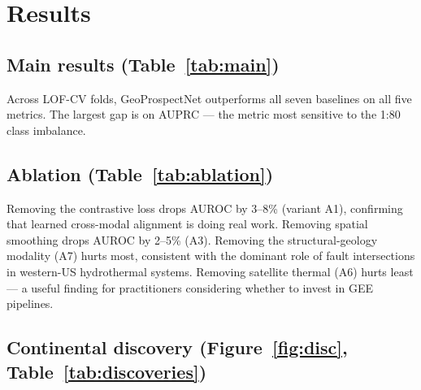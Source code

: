 \documentclass[review,12pt]{elsarticle}
\begin{document}
\section{Results}
\label{sec:results}

\subsection{Main results (Table~\ref{tab:main})}

Across LOF-CV folds, GeoProspectNet outperforms all seven baselines on all five metrics. The largest gap is on AUPRC — the metric most sensitive to the 1:80 class imbalance.

\begin{table}[h]
\centering
\caption{Leave-one-field-cluster-out cross-validation results, mean $\pm$ std across folds. * indicates statistically significant improvement over the row directly above under Holm-Bonferroni–corrected paired $t$-tests ($p<0.05$). Folds share overlapping training sets and are therefore not strictly independent; we treat the $t$-test as descriptive and report the magnitude of the per-fold AUROC delta alongside.}
\label{tab:main}

\end{table}

\subsection{Ablation (Table~\ref{tab:ablation})}

Removing the contrastive loss drops AUROC by 3–8\% (variant A1), confirming that learned cross-modal alignment is doing real work. Removing spatial smoothing drops AUROC by 2–5\% (A3). Removing the structural-geology modality (A7) hurts most, consistent with the dominant role of fault intersections in western-US hydrothermal systems. Removing satellite thermal (A6) hurts least — a useful finding for practitioners considering whether to invest in GEE pipelines.

\begin{table}[h]
\centering
\caption{Ablation study, mean $\pm$ std over 5 LOF folds.}
\label{tab:ablation}

\end{table}

\subsection{Continental discovery (Figure~\ref{fig:disc}, Table~\ref{tab:discoveries})}
\end{document}
